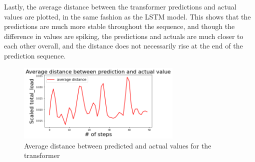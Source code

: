 \documentclass[main.tex]{subfiles}
\begin{document}
Lastly, the average distance between the transformer predictions and actual values are plotted, in the same fashion as the LSTM model. This shows that the predictions are much more stable throughout the sequence, and though the difference in values are spiking, the predictions and actuals are much closer to each other overall, and the distance does not necessarily rise at the end of the prediction sequence.

\begin{figure}[H]
    \centering
    \includegraphics[width=0.7\textwidth]{TransformerPlots/avgerrortransformer.png}
    \caption{Average distance between predicted and actual values for the transformer}
    \label{fig:avgerrortransformer}
\end{figure}
\end{document}
